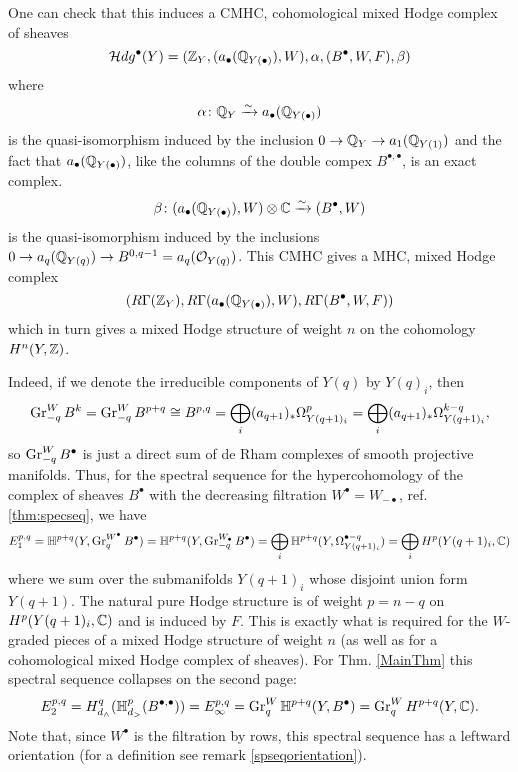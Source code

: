 \documentclass[../main.tex]{subfiles}
\begin{document}
One can check that this induces a CMHC, cohomological mixed Hodge complex of sheaves
\[      
\mathcal{H}dg^\bullet(Y) = (\mathbb{Z}_Y ,(a_{\bullet}(\mathbb{Q}_{Y({\bullet})}),W), \alpha ,(B^\bullet,W,F),   \beta)   
\] 
where  
\[
\alpha \colon \mathbb{Q}_Y \xrightarrow{\sim} a_{\bullet}(\mathbb{Q}_{Y({\bullet})})
\]
is the quasi-isomorphism induced by the inclusion $0 \to \mathbb{Q}_Y \to  a_{1}(\mathbb{Q}_{Y(1)})$ and the fact that $a_{\bullet}(\mathbb{Q}_{Y({\bullet})})$, like the columns of the double compex $B^{\bullet,\bullet}$, is an exact complex.
\[
\beta \colon (a_{\bullet}(\mathbb{Q}_{Y({\bullet})}),W) \otimes \mathbb{C} \xrightarrow{\sim} (B^\bullet,W)
\]
is the quasi-isomorphism induced by the inclusions $ 0 \to a_{q}(\mathbb{Q}_{Y({q})}) \to B^{0,q-1}= a_{q}(\mathcal{O}_{Y({q})})$.
This CMHC gives a MHC, mixed Hodge complex
    \[ 
    ( R\Gamma(\mathbb{Z}_Y), R\Gamma(a_{\bullet}(\mathbb{Q}_{Y({\bullet})}),W), R\Gamma(B^\bullet,W,F) ) 
        \]
    which in turn gives a mixed Hodge structure of weight $n$ on the cohomology $H^n(Y,\mathbb{Z})$. 
    
    Indeed, if we denote the irreducible components of $Y(q)$ by $Y(q)_i$, then
\begin{equation}
\operatorname{Gr}_{-q}^WB^{k}= \operatorname{Gr}_{-q}^WB^{p+q} \cong B^{p,q} = \bigoplus_i(a_{q+1})_*\Omega^p_{Y(q+1)_i} = \bigoplus_i(a_{q+1})_*\Omega^{k-q}_{Y(q+1)_i},
\label{B-gradeds} \end{equation}
so $\operatorname{Gr}_{-q}^WB^{\bullet}$ is just a direct sum of de Rham complexes of smooth projective manifolds. Thus, for the spectral sequence for the hypercohomology of the complex of sheaves $B^\bullet$ with the decreasing filtration $W^\bullet = W_{-\bullet}$, ref. \ref{thm:specseq}, we have
\[ 
E_1^{p,q} = \mathbb{H}^{p+q}(Y,\operatorname{Gr}_{q}^{W^\bullet}B^\bullet) = \mathbb{H}^{p+q}(Y,\operatorname{Gr}_{-q}^{W_\bullet}B^\bullet) =  \bigoplus_i \mathbb{H}^{p+q}(Y, \Omega^{\bullet - q}_{Y(q+1)_i}) = \bigoplus_i H^{p}(Y(q+1)_i,\mathbb{C})
\] 
where we sum over the submanifolds $Y(q+1)_i$ whose disjoint union form $Y(q+1)$. The natural pure Hodge structure is of weight $p=n-q$ on $H^{p}(Y(q+1)_i,\mathbb{C})$ and is induced by $F$. This is exactly what is required for the $W$-graded pieces of a mixed Hodge structure of weight $n$ (as well as for a cohomological mixed Hodge complex of sheaves). For Thm. \ref{MainThm} this spectral sequence collapses on the second page:
\[
E_2^{p,q}=H_{d_\wedge}^{q}(\mathbb{H}_{d_>}^{p} (B^{\bullet,\bullet}))=E_\infty^{p,q}=\operatorname{Gr}_q^{W} \mathbb{H}^{p+q}(Y,B^\bullet) = \operatorname{Gr}_q^{W} H^{p+q}(Y,\mathbb{C}).
\]
Note that, since $W^\bullet$ is the filtration by rows, this spectral sequence has a leftward orientation (for a definition see remark \ref{spseqorientation}).
\end{document}

